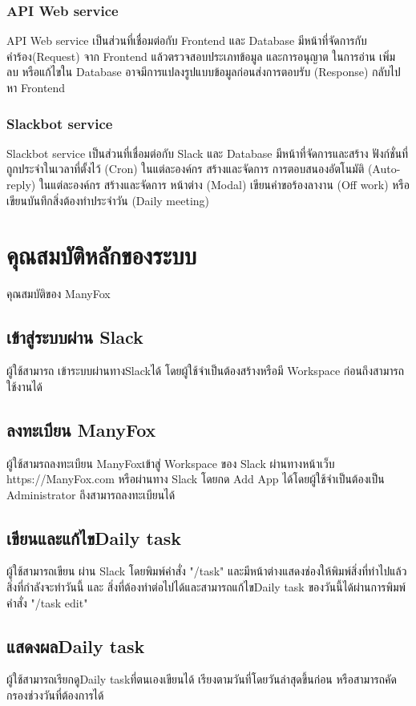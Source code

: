 \subsubsection{API Web service}
API Web service เป็นส่วนที่เชื่อมต่อกับ Frontend และ Database มีหน้าที่จัดการกับคำร้อง(Request) จาก Frontend
แล้วตรวจสอบประเภทข้อมูล และการอนุญาต ในการอ่าน เพิ่ม ลบ หรือแก้ไขใน Database อาจมีการแปลงรูปแบบข้อมูลก่อนส่งการตอบรับ (Response)
กลับไปหา Frontend

\subsubsection{Slackbot service}
Slackbot service เป็นส่วนที่เชื่อมต่อกับ Slack และ Database  มีหน้าที่จัดการและสร้าง ฟังก์ชั่นที่ถูกประจำในเวลาที่ตั้งไว้ (Cron) ในแต่ละองค์กร สร้างและจัดการ
การตอบสนองอัตโนมัติ (Auto-reply) ในแต่ละองค์กร สร้างและจัดการ หน้าต่าง (Modal) เขียนคำขอร้องลางาน (Off work) หรือ เขียนบันทึกสิ่งต้องทำประจำวัน (Daily meeting)



\section{คุณสมบัติหลักของระบบ}
คุณสมบัติของ ManyFox

\subsection{เข้าสู่ระบบผ่าน Slack}
ผู้ใช้สามารถ เข้าระบบผ่านทางSlackได้ โดยผู้ใช้จำเป็นต้องสร้างหรือมี Workspace ก่อนถึงสามารถใช้งานได้
\subsection{ลงทะเบียน ManyFox}
ผู้ใช้สามรถลงทะเบียน ManyFoxเข้าสู่ Workspace ของ Slack ผ่านทางหน้าเว็บ https://ManyFox.com หรือผ่านทาง Slack โดยกด Add App
ได้โดยผู้ใช้จำเป็นต้องเป็น Administrator ถึงสามารถลงทะเบียนได้

\subsection{เขียนและแก้ไขDaily task}
ผู้ใช้สามารถเขียน ผ่าน Slack โดยพิมพ์คำสั่ง "/task" และมีหน้าต่างแสดงช่องให้พิมพ์สิ่งที่ทำไปแล้ว สิ่งที่กำลังจะทำวันนี้ และ สิ่งที่ต้องทำต่อไปได้และสามารถแก้ไขDaily task ของวันนี้ได้ผ่านการพิมพ์คำสั่ง "/task edit"
\subsection{แสดงผลDaily task}
ผู้ใช้สามารถเรียกดูDaily taskที่ตนเองเขียนได้ เรียงตามวันที่โดยวันล่าสุดขึ้นก่อน หรือสามารถคัดกรองช่วงวันที่ต้องการได้

